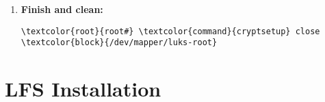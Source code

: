 \documentclass[10pt, a4paper, onecolumn, oneside, titlepage, openany]{book}
\begin{document}
\begin{enumerate}
\begin{enumerate}
\begin{Verbatim}[commandchars=\\\{\}]
\textcolor{root}{root#} \textcolor{command}{mkfs.btrfs} \textcolor{block}{/dev/mapper/luks-root}
\textcolor{root}{root#} \textcolor{command}{btrfs} filesystem label \textcolor{block}{/dev/mapper/luks-root}
LUKS-ROOT
\textcolor{root}{root#} \textcolor{command}{btrfstune} -U 00000000-0000-0000-0000-000000000003
\textcolor{block}{/dev/mapper/luks-root}
\textcolor{root}{>} y
\textcolor{root}{root#} \textcolor{command}{btrfs} check -p \textcolor{block}{/dev/mapper/luks-root} ; \textcolor{command}{echo} \$?
\end{Verbatim}
    \end{enumerate}
    \item \textbf{Finish and clean:}
\begin{Verbatim}[commandchars=\\\{\}]
\textcolor{root}{root#} \textcolor{command}{cryptsetup} close \textcolor{block}{/dev/mapper/luks-root}
\end{Verbatim}
\end{enumerate}


\chapter{LFS Installation}
\end{document}
